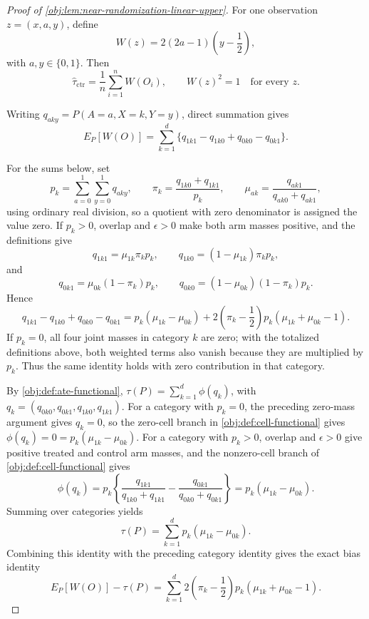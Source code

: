 \begin{proof}[Proof of \cref{obj:lem:near-randomization-linear-upper}]
For one observation \(z=(x,a,y)\), define
\[
W(z)=2(2a-1)\left(y-\frac12\right),
\]
with \(a,y\in\{0,1\}\). Then
\[
\widehat\tau_{\mathrm{ctr}}
=
\frac1n\sum_{i=1}^n W(O_i),
\qquad
W(z)^2=1
\quad\text{for every }z .
\]

Writing \(q_{aky}=P(A=a,X=k,Y=y)\), direct summation gives
\[
E_P[W(O)]
=
\sum_{k=1}^d
\{q_{1k1}-q_{1k0}+q_{0k0}-q_{0k1}\}.
\]

For the sums below, set
\[
p_k=\sum_{a=0}^1\sum_{y=0}^1 q_{aky},
\qquad
\pi_k=\frac{q_{1k0}+q_{1k1}}{p_k},
\qquad
\mu_{ak}=\frac{q_{ak1}}{q_{ak0}+q_{ak1}},
\]
using ordinary real division, so a quotient with zero denominator is assigned the value zero. If \(p_k>0\), overlap and \(\epsilon>0\) make both arm masses positive, and the definitions give
\[
q_{1k1}=\mu_{1k}\pi_kp_k,
\qquad
q_{1k0}=(1-\mu_{1k})\pi_kp_k,
\]
and
\[
q_{0k1}=\mu_{0k}(1-\pi_k)p_k,
\qquad
q_{0k0}=(1-\mu_{0k})(1-\pi_k)p_k .
\]
Hence
\[
q_{1k1}-q_{1k0}+q_{0k0}-q_{0k1}
=
p_k(\mu_{1k}-\mu_{0k})
+
2\left(\pi_k-\frac12\right)p_k(\mu_{1k}+\mu_{0k}-1).
\]
If \(p_k=0\), all four joint masses in category \(k\) are zero; with the totalized definitions above, both weighted terms also vanish because they are multiplied by \(p_k\). Thus the same identity holds with zero contribution in that category. %

By \cref{obj:def:ate-functional}, \(\tau(P)=\sum_{k=1}^d\phi(q_k)\), with \(q_k=(q_{0k0},q_{0k1},q_{1k0},q_{1k1})\). For a category with \(p_k=0\), the preceding zero-mass argument gives \(q_k=0\), so the zero-cell branch in \cref{obj:def:cell-functional} gives \(\phi(q_k)=0=p_k(\mu_{1k}-\mu_{0k})\). For a category with \(p_k>0\), overlap and \(\epsilon>0\) give positive treated and control arm masses, and the nonzero-cell branch of \cref{obj:def:cell-functional} gives
\[
\phi(q_k)
=
p_k\left\{
\frac{q_{1k1}}{q_{1k0}+q_{1k1}}
-
\frac{q_{0k1}}{q_{0k0}+q_{0k1}}
\right\}
=
p_k(\mu_{1k}-\mu_{0k}).
\]
Summing over categories yields
\[
\tau(P)=\sum_{k=1}^d p_k(\mu_{1k}-\mu_{0k}).
\]
Combining this identity with the preceding category identity gives the exact bias identity
\[
E_P[W(O)]-\tau(P)
=
\sum_{k=1}^d
2\left(\pi_k-\frac12\right)p_k(\mu_{1k}+\mu_{0k}-1).
\]


\end{proof}
